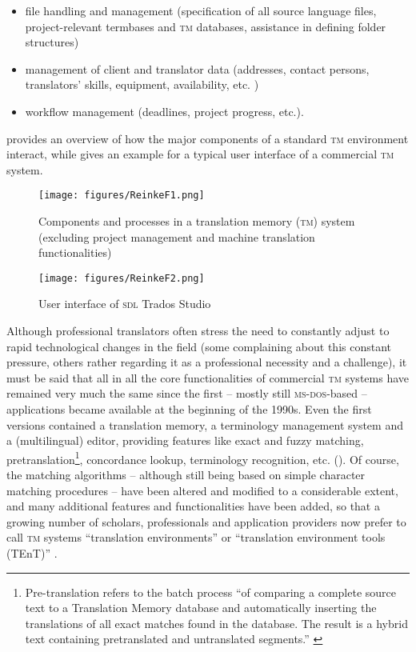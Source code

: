 \documentclass[output=paper]{LSP/langsci}
\begin{document}
\begin{itemize}
\item 
file handling and management (specification of all source language files, project-relevant termbases and \textsc{tm} databases, assistance in defining folder structures)
\item 
management of client and translator data (addresses, contact persons, translators' skills, equipment, availability, etc. )
\item 
workflow management (deadlines, project progress, etc.).
\end{itemize}

 provides an overview of how the major components of a standard \textsc{tm} environment interact, while  gives an example for a typical user interface of a commercial \textsc{tm} system.

\begin{figure}[h]
\texttt{[image: figures/ReinkeF1.png]}
\caption{Components and processes in a translation memory (\textsc{tm}) system (excluding project management and machine translation functionalities)}
\label{fig:reinke:1}
\end{figure} 

\begin{figure}[h]
\texttt{[image: figures/ReinkeF2.png]}
\caption{User interface of \textsc{sdl} Trados Studio}
\label{fig:reinke:2}
\end{figure}

Although professional translators often stress the need to constantly adjust to rapid technological changes in the field (some complaining about this constant pressure, others rather regarding it as a professional necessity and a challenge), it must be said that all in all the core functionalities of commercial \textsc{tm} systems have remained very much the same since the first -- mostly still \textsc{ms-dos}-based -- applications became available at the beginning of the 1990s. Even the first versions contained a translation memory, a terminology management system and a (multilingual) editor, providing features like exact and fuzzy matching, pretranslation\footnote{Pre-translation refers to the batch process ``of comparing a complete source text to a Translation Memory database and automatically inserting the translations of all exact matches found in the database. The result is a hybrid text containing pretranslated and untranslated segments.'' \citep{eCoLoRe2012}}, concordance lookup, terminology recognition, etc. (). Of course, the matching algorithms -- although still being based on simple character matching procedures -- have been altered and modified to a considerable extent, and many additional features and functionalities have been added, so that a growing number of scholars, professionals and application providers now prefer to call \textsc{tm} systems ``translation environments'' or ``translation environment tools (TEnT)'' \citep[8]{CERTT2012}.
\end{document}
